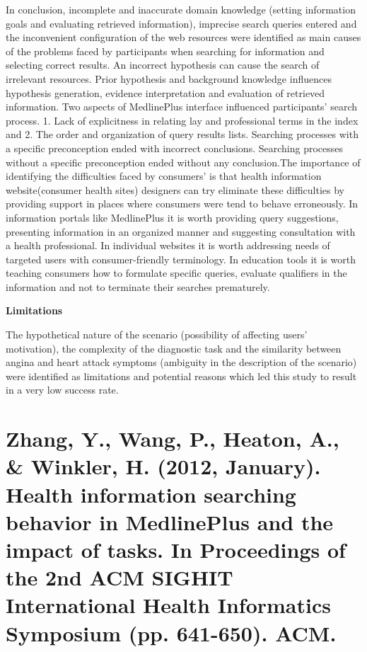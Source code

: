 \documentclass[]{article}
\begin{document}
In conclusion, incomplete and inaccurate domain knowledge (setting information goals and evaluating retrieved information), imprecise search queries entered and the inconvenient configuration of the web resources were identified as main causes of the problems faced by participants when searching for information and selecting correct results. An incorrect hypothesis can cause the search of irrelevant resources. Prior hypothesis and background knowledge influences hypothesis generation, evidence interpretation and evaluation of retrieved information. Two aspects of MedlinePlus interface influenced participants’ search process. 1. Lack of explicitness in relating lay and professional terms in the index and 2. The order and organization of query results lists. Searching processes with a specific preconception ended with incorrect conclusions. Searching processes without a specific preconception ended without any conclusion.The importance of identifying the difficulties faced by consumers’ is that health information website(consumer health sites) designers can try eliminate these difficulties by providing support in places where consumers were tend to behave erroneously. In information portals like MedlinePlus it is worth providing query suggestions, presenting information in an organized manner and suggesting consultation with a health professional. In individual websites it is worth addressing needs of targeted users with consumer-friendly terminology. In education tools it is worth teaching consumers how to formulate specific queries, evaluate qualifiers in the information and not to terminate their searches prematurely.

\textbf{Limitations}

The hypothetical nature of the scenario (possibility of affecting users’ motivation), the complexity of the diagnostic task and the similarity between angina and heart attack symptoms (ambiguity in the description of the scenario) were identified as limitations and potential reasons which led this study to result in a very low success rate. 

\section{Zhang, Y., Wang, P., Heaton, A., \& Winkler, H. (2012, January). Health information searching behavior in MedlinePlus and the impact of tasks. In Proceedings of the 2nd ACM SIGHIT International Health Informatics Symposium (pp. 641-650). ACM.} 
\end{document}
